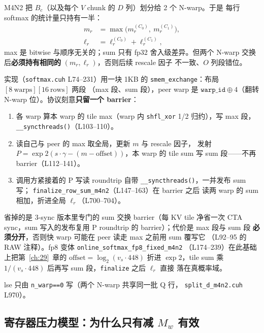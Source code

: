 M4N2 把 $B_c$（以及每个 $V$ chunk 的 $D$ 列）划分给 2 个 N-warp。于是
每行 softmax 的统计量只持有一半：
\begin{align}
m_r &= \max\bigl(m_r^{(C_0)},\ m_r^{(C_1)}\bigr),\label{eq:30-maxmerge}\\
\ell_r &= \ell_r^{(C_0)}+\ell_r^{(C_1)},\label{eq:30-summerge}
\end{align}
max 是 bitwise 与顺序无关的；sum 只有 fp32 舍入级差异。但两个 N-warp
交换后\textbf{必须持有相同的} $(m_r,\ell_r)$，否则后续 rescale 因子
不一致、$O$ 列段错位。

实现（\texttt{softmax.cuh} L74--231）用一块 1KB 的
\texttt{smem\_exchange}：布局 $[8\ \text{warps}][16\ \text{rows}]$ 两段
（max 段、sum 段），peer warp 是 $\texttt{warp\_id}\oplus 4$（翻转
N-warp 位）。协议刻意\textbf{只留一个 barrier}：

\begin{enumerate}[itemsep=0pt,topsep=2pt]
  \item 各 warp 算本 warp 的 tile max（warp 内 \texttt{shfl\_xor} 1/2
        归约），写 max 段，\texttt{\_\_syncthreads()}（L103--110）。
  \item 读自己与 peer 的 max 取全局，更新 $m$ 与 rescale 因子，
        发射 $P=\exp2(s\cdot\gamma-(m-\text{offset}))$，本 warp 的
        tile sum 写 sum 段——不再 barrier（L112--141）。
  \item 调用方紧接着的 P 写读 roundtrip 自带
        \texttt{\_\_syncthreads()}，一并发布 sum 写；
        \texttt{finalize\_row\_sum\_m4n2}（L147--163）在 barrier 之后
        读两 warp 的 sum 相加，折进全局 $\ell_r$（L700--704）。
\end{enumerate}

省掉的是 3-sync 版本里专门的 sum 交换 barrier（每 KV tile 净省一次
CTA sync，sum 写入的发布复用 P roundtrip 的 barrier）；代价是 max 段与 sum 段
\textbf{必须分开}，否则快 warp 可能在 peer 读走 max 之前用 sum 覆写它
（L92--95 的 RAW 注释）。fp8 变体 \texttt{online\_softmax\_fp8\_fixed\_m4n2}
（L174--239）在此基础上把第~\ref{ch:29}~章的
$\text{offset}=\log_2(v_s\cdot448)$ 折进 $\exp2$，tile sum 乘
$1/(v_s\cdot448)$ 后再写 sum 段，\texttt{finalize} 之后 $\ell_r$ 直接
落在真概率域。

lse 只由 \texttt{n\_warp==0} 写（两个 N-warp 共享同一批 Q 行，
\texttt{split\_d\_m4n2.cuh} L970）。

\subsection{寄存器压力模型：为什么只有减 $M_w$ 有效}\label{sec:30-regmodel}

